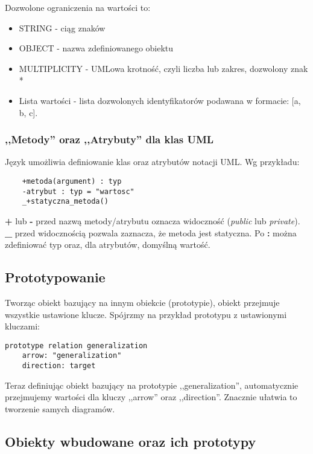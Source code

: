 Dozwolone ograniczenia na wartości to:
\begin{itemize}
	\item STRING - ciąg znaków
	\item OBJECT - nazwa zdefiniowanego obiektu
	\item MULTIPLICITY - UMLowa krotność, czyli liczba lub zakres, dozwolony znak *
	\item Lista wartości - lista dozwolonych identyfikatorów podawana w formacie: [a, b, c].
\end{itemize}

\subsubsection{,,Metody'' oraz ,,Atrybuty'' dla klas UML}

Język \omlet umożliwia definiowanie klas oraz atrybutów notacji UML. Wg przykładu:
\begin{lstlisting}
	+metoda(argument) : typ
    -atrybut : typ = "wartosc"
    _+statyczna_metoda()
\end{lstlisting}

\textbf{+} lub \textbf{-} przed nazwą metody/atrybutu oznacza widoczność (\emph{public} lub \emph{private}). \textbf{\_} przed widocznością pozwala zaznacza, że metoda jest statyczna. Po \textbf{:} można zdefiniować typ oraz, dla atrybutów, domyślną wartość.

\subsection{Prototypowanie}

Tworząc obiekt bazujący na innym obiekcie (prototypie), obiekt przejmuje wszystkie ustawione klucze. Spójrzmy na przykład prototypu z ustawionymi kluczami:

\begin{lstlisting}
prototype relation generalization
    arrow: "generalization"
    direction: target
\end{lstlisting}

Teraz definiując obiekt bazujący na prototypie ,,generalization'', automatycznie przejmujemy wartości dla kluczy ,,arrow'' oraz ,,direction''. Znacznie ułatwia to tworzenie samych diagramów.

\subsection{Obiekty wbudowane oraz ich prototypy}

